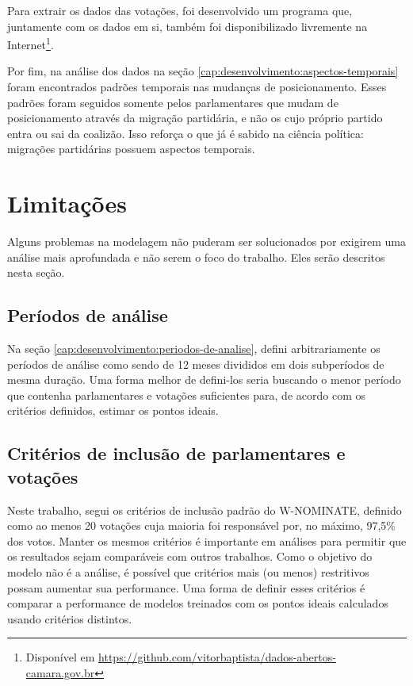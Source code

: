 \documentclass[a4paper,titlepage]{ppgi}\usepackage[]{graphicx}\usepackage[]{color}
\begin{document}
Para extrair os dados das votações, foi desenvolvido um programa que,
juntamente com os dados em si, também foi disponibilizado livremente na
Internet\footnote{Disponível em
\url{https://github.com/vitorbaptista/dados-abertos-camara.gov.br}}.

Por fim, na análise dos dados na seção
\ref{cap:desenvolvimento:aspectos-temporais} foram encontrados padrões
temporais nas mudanças de posicionamento. Esses padrões foram seguidos somente
pelos parlamentares que mudam de posicionamento através da migração partidária,
e não os cujo próprio partido entra ou sai da coalizão. Isso reforça o que já
é sabido na ciência política: migrações partidárias possuem aspectos temporais.

\section{Limitações}
\label{cap:conclusao:limitacoes}

Alguns problemas na modelagem não puderam ser solucionados por exigirem uma
análise mais aprofundada e não serem o foco do trabalho. Eles serão descritos
nesta seção.

\subsection{Períodos de análise}

Na seção \ref{cap:desenvolvimento:periodos-de-analise}, defini arbitrariamente
os períodos de análise como sendo de 12 meses divididos em dois subperíodos de
mesma duração. Uma forma melhor de defini-los seria buscando o menor período
que contenha parlamentares e votações suficientes para, de acordo com os
critérios definidos, estimar os pontos ideais.

\subsection{Critérios de inclusão de parlamentares e votações}

Neste trabalho, segui os critérios de inclusão padrão do W-NOMINATE, definido
como ao menos 20 votações cuja maioria foi responsável por, no máximo, 97,5\%
dos votos. Manter os mesmos critérios é importante em análises para permitir
que os resultados sejam comparáveis com outros trabalhos. Como o objetivo do
modelo não é a análise, é possível que critérios mais (ou menos) restritivos
possam aumentar sua performance. Uma forma de definir esses critérios é
comparar a performance de modelos treinados com os pontos ideais calculados
usando critérios distintos.
\end{document}
